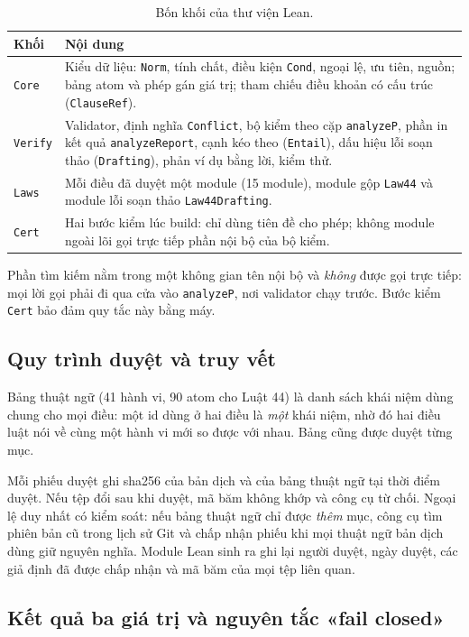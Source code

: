 \documentclass[12pt,a4paper]{article}
\newcommand{\code}[1]{\texttt{#1}}
\begin{document}
\begin{table}[H]
\centering\small
\caption{Bốn khối của thư viện Lean.}
\begin{tabularx}{\textwidth}{>{\raggedright\arraybackslash}p{2.4cm}L}
\toprule
Khối & Nội dung\\
\midrule
\code{Core} & Kiểu dữ liệu: \code{Norm}, tính chất, điều kiện \code{Cond}, ngoại lệ, ưu tiên, nguồn; bảng atom và phép gán giá trị;
tham chiếu điều khoản có cấu trúc (\code{ClauseRef}).\\
\code{Verify} & Validator, định nghĩa \code{Conflict}, bộ kiểm theo cặp \code{analyzeP}, phần in kết quả \code{analyzeReport},
cạnh kéo theo (\code{Entail}), dấu hiệu lỗi soạn thảo (\code{Drafting}), phản ví dụ bằng lời, kiểm thử.\\
\code{Laws} & Mỗi điều đã duyệt một module (15 module), module gộp \code{Law44} và module lỗi soạn thảo
\code{Law44Drafting}.\\
\code{Cert} & Hai bước kiểm lúc build: chỉ dùng tiên đề cho phép; không module ngoài lõi gọi trực tiếp phần nội bộ của bộ
kiểm.\\
\bottomrule
\end{tabularx}
\end{table}

Phần tìm kiếm nằm trong một không gian tên nội bộ và \emph{không} được gọi trực tiếp: mọi lời gọi phải đi qua cửa vào
\code{analyzeP}, nơi validator chạy trước. Bước kiểm \code{Cert} bảo đảm quy tắc này bằng máy.

\subsection{Quy trình duyệt và truy vết}

Bảng thuật ngữ (41 hành vi, 90 atom cho Luật 44) là danh sách khái niệm dùng chung cho mọi điều: một id dùng ở hai điều là
\emph{một} khái niệm, nhờ đó hai điều luật nói về cùng một hành vi mới so được với nhau. Bảng cũng được duyệt từng mục.

Mỗi phiếu duyệt ghi sha256 của bản dịch và của bảng thuật ngữ tại thời điểm duyệt. Nếu tệp đổi sau khi duyệt, mã băm không
khớp và công cụ từ chối. Ngoại lệ duy nhất có kiểm soát: nếu bảng thuật ngữ chỉ được \emph{thêm} mục, công cụ tìm phiên bản
cũ trong lịch sử Git và chấp nhận phiếu khi mọi thuật ngữ bản dịch dùng giữ nguyên nghĩa. Module Lean sinh ra ghi lại người
duyệt, ngày duyệt, các giả định đã được chấp nhận và mã băm của mọi tệp liên quan.

\subsection{Kết quả ba giá trị và nguyên tắc «fail closed»}
\end{document}
